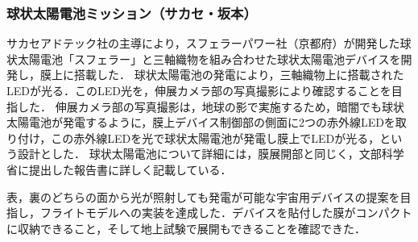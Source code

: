 \subsubsection{球状太陽電池ミッション（サカセ・坂本）}

サカセアドテック社の主導により，スフェラーパワー社（京都府）が開発した球状太陽電池「スフェラー」と三軸織物を組み合わせた球状太陽電池デバイスを開発し，膜上に搭載した．
球状太陽電池の発電により，三軸織物上に搭載されたLEDが光る．このLED光を，伸展カメラ部の写真撮影により確認することを目指した．
伸展カメラ部の写真撮影は，地球の影で実施するため，暗闇でも球状太陽電池が発電するように，膜上デバイス制御部の側面に2つの赤外線LEDを取り付け，この赤外線LEDを光で球状太陽電池が発電し膜上でLEDが光る，という設計とした．
球状太陽電池について詳細には，膜展開部と同じく，文部科学省に提出した報告書に詳しく記載している．

表，裏のどちらの面から光が照射しても発電が可能な宇宙用デバイスの提案を目指し，フライトモデルへの実装を達成した．デバイスを貼付した膜がコンパクトに収納できること，そして地上試験で展開もできることを確認できた．




